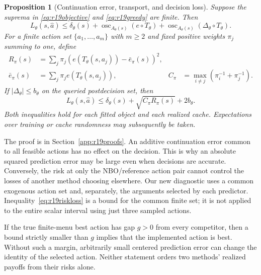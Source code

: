 \documentclass[ecta,nameyear,draft]{econsocart}
\newtheorem{proposition}[theorem]{Proposition}
\theoremstyle{definition}
\theoremstyle{remark}
\begin{document}
\begin{proposition}[Continuation error, transport, and decision loss]
\label{prop:r19decision}
Suppose the suprema in \eqref{eq:r19objective} and
\eqref{eq:r19greedy} are finite. Then
\begin{equation}
 L_\theta(s,\widehat a)\leq\delta_\theta(s)
  +\operatorname{osc}_{A_\theta(s)}(e\circ T_\theta)
  +\operatorname{osc}_{A_\theta(s)}(\Delta_\theta\circ T_\theta).
 \label{eq:r19osc}
\end{equation}
For a finite action set $\{a_1,\ldots,a_m\}$ with $m\geq2$ and fixed
positive weights $\pi_j$ summing to one, define
\begin{align*}
 R_\pi(s)&=\sum_j\pi_j(e(T_\theta(s,a_j))-\bar e_\pi(s))^2,\\
 \bar e_\pi(s)&=\sum_j\pi_j e(T_\theta(s,a_j)),
 &C_\pi&=\max_{i\ne j}(\pi_i^{-1}+\pi_j^{-1}).
\end{align*}
If $|\Delta_\theta|\leq b_\theta$ on the queried postdecision set, then
\begin{equation}
 L_\theta(s,\widehat a)\leq\delta_\theta(s)
                       +\sqrt{C_\pi R_\pi(s)}+2b_\theta.
 \label{eq:r19riskloss}
\end{equation}
Both inequalities hold for each fitted object and each realized cache.
Expectations over training or cache randomness may subsequently be taken.
\end{proposition}

The proof is in Section~\ref{app:r19proofs}. An additive continuation error
common to all feasible actions has no effect on the decision. This is why
an absolute squared prediction error may be large even when decisions are
accurate. Conversely, the risk at only the NBO/reference action pair cannot
control the losses of another method choosing elsewhere. Our new diagnostic
uses a common exogenous action set and, separately, the arguments selected
by each predictor. Inequality~\eqref{eq:r19riskloss} is a bound for the common
finite set; it is not applied to the entire scalar interval using just three
sampled actions.

If the true finite-menu best action has gap $g>0$ from every competitor,
then a bound strictly smaller than $g$ implies that the implemented action
is best. Without such a margin, arbitrarily small centered prediction error
can change the identity of the selected action. Neither statement orders two
methods' realized payoffs from their risks alone.
\end{document}
